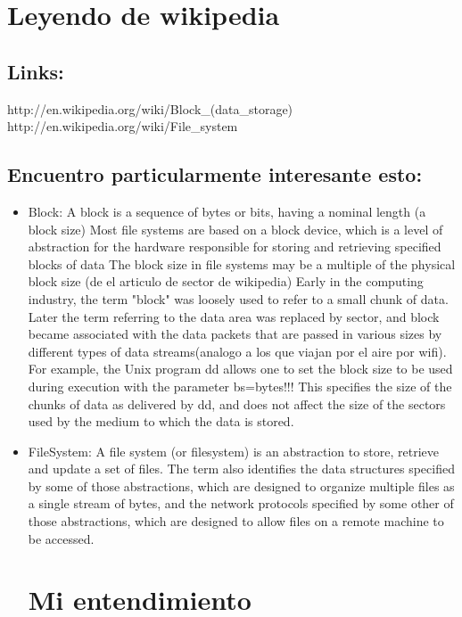 

\section{Leyendo de wikipedia}

\subsection{Links:}

http://en.wikipedia.org/wiki/Block_(data_storage)
http://en.wikipedia.org/wiki/File_system

\subsection{Encuentro particularmente interesante esto:}
\begin{itemize}
\item
Block:
A block is a sequence of bytes or bits, having a nominal length (a block size)
Most file systems are based on a block device, which is a level of abstraction for the hardware responsible for storing and retrieving specified blocks of data
The block size in file systems may be a multiple of the physical block size
(de el articulo de sector de wikipedia)
Early in the computing industry, the term "block" was loosely used to refer to a small chunk of data. Later the term referring to the data area was replaced by sector, and block became associated with the data packets that are passed in various sizes by different types of data streams(analogo a los que viajan por el aire por wifi). For example, the Unix program dd allows one to set the block size to be used during execution with the parameter bs=bytes!!! This specifies the size of the chunks of data as delivered by dd, and does not affect the size of the sectors used by the medium to which the data is stored.
\item
FileSystem:
A file system (or filesystem) is an abstraction to store, retrieve and update a set of files. The term also identifies the data structures specified by some of those abstractions, which are designed to organize multiple files as a single stream of bytes, and the network protocols specified by some other of those abstractions, which are designed to allow files on a remote machine to be accessed.

\begin{itemize}

\section{Mi entendimiento}


\end{itemize}
\end{itemize}
